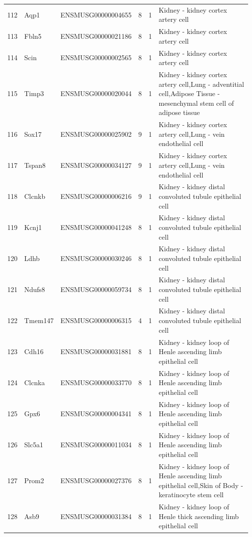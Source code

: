 \begin{table}[ht]
{\begin{tabular}{lllrrl}
        112 & Aqp1 & ENSMUSG00000004655 & 8 & 1 & Kidney - kidney cortex artery cell \\
        113 & Fbln5 & ENSMUSG00000021186 & 8 & 1 & Kidney - kidney cortex artery cell \\
        114 & Scin & ENSMUSG00000002565 & 8 & 1 & Kidney - kidney cortex artery cell \\
        115 & Timp3 & ENSMUSG00000020044 & 8 & 1 & Kidney - kidney cortex artery cell,Lung - adventitial cell,Adipose Tissue - mesenchymal stem cell of adipose tissue \\
        116 & Sox17 & ENSMUSG00000025902 & 9 & 1 & Kidney - kidney cortex artery cell,Lung - vein endothelial cell \\
        117 & Tspan8 & ENSMUSG00000034127 & 9 & 1 & Kidney - kidney cortex artery cell,Lung - vein endothelial cell \\
        118 & Clcnkb & ENSMUSG00000006216 & 9 & 1 & Kidney - kidney distal convoluted tubule epithelial cell \\
        119 & Kcnj1 & ENSMUSG00000041248 & 8 & 1 & Kidney - kidney distal convoluted tubule epithelial cell \\
        120 & Ldhb & ENSMUSG00000030246 & 8 & 1 & Kidney - kidney distal convoluted tubule epithelial cell \\
        121 & Ndufs8 & ENSMUSG00000059734 & 8 & 1 & Kidney - kidney distal convoluted tubule epithelial cell \\
        122 & Tmem147 & ENSMUSG00000006315 & 4 & 1 & Kidney - kidney distal convoluted tubule epithelial cell \\
        123 & Cdh16 & ENSMUSG00000031881 & 8 & 1 & Kidney - kidney loop of Henle ascending limb epithelial cell \\
        124 & Clcnka & ENSMUSG00000033770 & 8 & 1 & Kidney - kidney loop of Henle ascending limb epithelial cell \\
        125 & Gpx6 & ENSMUSG00000004341 & 8 & 1 & Kidney - kidney loop of Henle ascending limb epithelial cell \\
        126 & Slc5a1 & ENSMUSG00000011034 & 8 & 1 & Kidney - kidney loop of Henle ascending limb epithelial cell \\
        127 & Prom2 & ENSMUSG00000027376 & 8 & 1 & Kidney - kidney loop of Henle ascending limb epithelial cell,Skin of Body - keratinocyte stem cell \\
        128 & Asb9 & ENSMUSG00000031384 & 8 & 1 & Kidney - kidney loop of Henle thick ascending limb epithelial cell \\

\end{tabular}}
\end{table}
